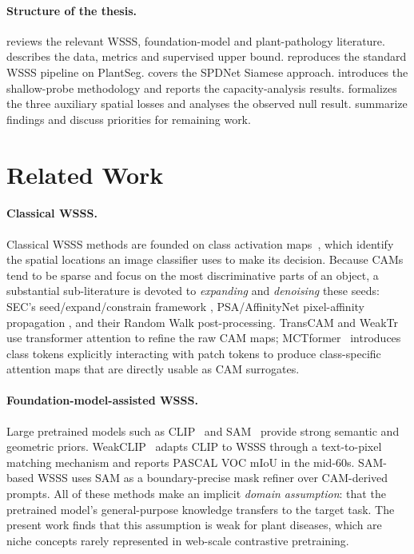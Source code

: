 \documentclass[11pt,a4paper]{article}
\begin{document}
\paragraph{Structure of the thesis.}
 reviews the relevant WSSS, foundation-model and
plant-pathology literature.  describes the data, metrics
and supervised upper bound.  reproduces the
standard WSSS pipeline on PlantSeg.  covers the SPDNet
Siamese approach.  introduces the shallow-probe
methodology and reports the capacity-analysis results. 
formalizes the three auxiliary spatial losses and analyses the observed
null result.  summarize findings and
discuss priorities for remaining work.

\section{Related Work}
\label{sec:related}

\paragraph{Classical WSSS.}
Classical WSSS methods are founded on class activation
maps~\citep{cam,gradcam}, which identify the spatial locations an
image classifier uses to make its decision. Because CAMs tend to be
sparse and focus on the most discriminative parts of an object, a
substantial sub-literature is devoted to \emph{expanding} and
\emph{denoising} these seeds: SEC's seed/expand/constrain framework
\citep{sec}, PSA/AffinityNet pixel-affinity propagation
\citep{affinitynet}, and their Random Walk post-processing. TransCAM
\citep{transcam} and WeakTr~\citep{weaktr} use transformer attention
to refine the raw CAM maps; MCTformer~\citep{mctformer} introduces
class tokens explicitly interacting with patch tokens to produce
class-specific attention maps that are directly usable as CAM surrogates.

\paragraph{Foundation-model-assisted WSSS.}
Large pretrained models such as CLIP~\citep{clip} and SAM~\citep{sam}
provide strong semantic and geometric priors. WeakCLIP~\citep{weakclip}
adapts CLIP to WSSS through a text-to-pixel matching mechanism and
reports PASCAL VOC mIoU in the mid-$60$s. SAM-based WSSS
\citep{sam_pseudo,s2c,fm_wsss} uses SAM as a boundary-precise mask
refiner over CAM-derived prompts. All of these methods make an implicit
\emph{domain assumption}: that the pretrained model's general-purpose
knowledge transfers to the target task. The present work finds that this
assumption is weak for plant diseases, which are niche concepts rarely
represented in web-scale contrastive pretraining.
\end{document}
